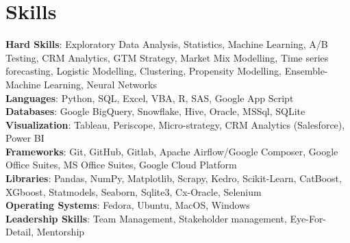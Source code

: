 \section{Skills}
  \begin{itemize}[leftmargin=0.1in, label={}]
    \normalsize{\item{
      \textbf{Hard Skills}: Exploratory Data Analysis, Statistics, Machine Learning, A/B Testing, CRM Analytics, GTM Strategy, Market Mix Modelling, Time series forecasting, Logistic Modelling, Clustering, Propensity Modelling, Ensemble-Machine Learning, Neural Networks \\
      \textbf{Languages}: Python, SQL, Excel, VBA, R, SAS, Google App Script\\
      \textbf{Databases}: Google BigQuery, Snowflake, Hive, Oracle, MSSql, SQLite \\
      \textbf{Visualization}: Tableau, Periscope, Micro-strategy, CRM Analytics (Salesforce), Power BI \\
      \textbf{Frameworks}: Git, GitHub, Gitlab, Apache Airflow/Google Composer, Google Office Suites, MS Office Suites, Google Cloud Platform \\
      \textbf{Libraries}: Pandas, NumPy, Matplotlib, Scrapy, Kedro, Scikit-Learn, CatBoost, XGboost, Statmodels, Seaborn, Sqlite3, Cx-Oracle, Selenium \\
      \textbf{Operating Systems}: Fedora, Ubuntu, MacOS, Windows \\
      \textbf{Leadership Skills}: Team Management, Stakeholder management, Eye-For-Detail, Mentorship \\
     }}
  \end{itemize}
